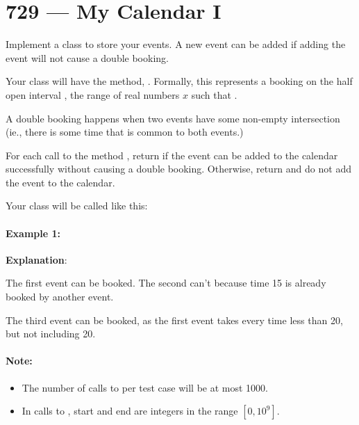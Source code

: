 \section{729 --- My Calendar I}
Implement a  class to store your events. A new event can be added if adding the event will not cause a double booking.

Your class will have the method, . Formally, this represents a booking on the half open interval \fcj{[start, end)}, the range of real numbers $x$ such that .

A double booking happens when two events have some non-empty intersection (ie., there is some time that is common to both events.)

For each call to the method , return  if the event can be added to the calendar successfully without causing a double booking. Otherwise, return  and do not add the event to the calendar.

Your class will be called like this: 


\paragraph{Example 1:}
\begin{flushleft}







\textbf{Explanation}:
 
The first event can be booked.  The second can't because time 15 is already booked by another event.

The third event can be booked, as the first event takes every time less than 20, but not including 20.

\end{flushleft}

\paragraph{Note:}

\begin{itemize}
\item The number of calls to  per test case will be at most 1000.
\item In calls to , start and end are integers in the range $[0, 10^9]$.
\end{itemize}

